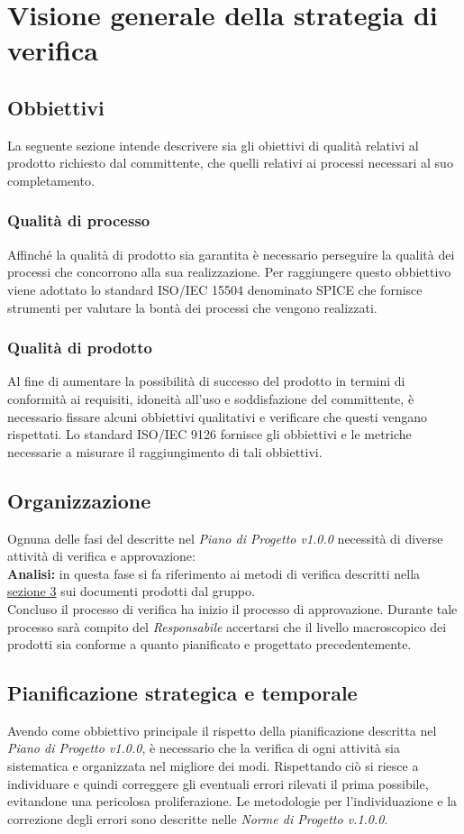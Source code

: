 \chapter{Visione generale della strategia di verifica}
\section{Obbiettivi}
La seguente sezione intende descrivere sia gli obiettivi di qualità relativi al prodotto richiesto dal committente, che quelli relativi ai processi necessari al suo completamento.
\subsection{Qualità di processo}
Affinché la qualità di prodotto sia garantita è necessario perseguire la qualità dei processi che concorrono alla sua realizzazione. Per raggiungere questo obbiettivo viene adottato lo standard ISO/IEC 15504 denominato SPICE che fornisce strumenti per valutare la bontà dei processi che vengono realizzati.
\subsection{Qualità di prodotto}
Al fine di aumentare la possibilità di successo del prodotto in termini di conformità ai requisiti, idoneità all'uso e soddisfazione del committente, è necessario fissare alcuni obbiettivi qualitativi e verificare che questi vengano rispettati.
Lo standard ISO/IEC 9126 fornisce gli obbiettivi e le metriche necessarie a misurare il raggiungimento di tali obbiettivi.
\section{Organizzazione}
Ognuna delle fasi del  descritte nel \textit{Piano di Progetto v1.0.0} necessità di diverse attività di verifica e approvazione:\\\newline
 \textbf{Analisi:} in questa fase si fa riferimento ai metodi di verifica descritti nella \hyperref[Metodi]{sezione 3} sui documenti prodotti dal gruppo.\\ \newline
Concluso il processo di verifica ha inizio il processo di approvazione. Durante tale processo sarà compito del \textit{Responsabile} accertarsi che il livello macroscopico dei prodotti sia conforme a quanto pianificato e progettato precedentemente.
\section{Pianificazione strategica e temporale}
Avendo come obbiettivo principale il rispetto della pianificazione descritta nel \textit{Piano di Progetto v1.0.0}, è necessario che la verifica di ogni attività sia sistematica e organizzata nel migliore dei modi. 
Rispettando ciò si riesce a individuare e quindi correggere gli eventuali errori rilevati il prima possibile, evitandone una pericolosa proliferazione. 
Le metodologie per l'individuazione e la correzione degli errori sono descritte nelle \textit{Norme di Progetto v.1.0.0}.
